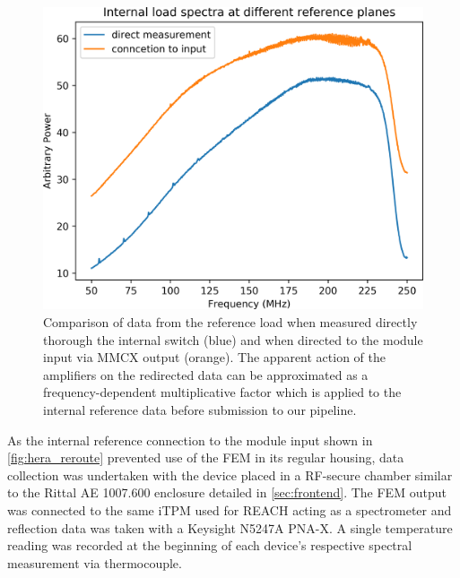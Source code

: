 \begin{figure}
    \centering
    \includegraphics[width=.6\textwidth]{mmcx_compare}
    \caption{Comparison of data from the reference load when measured directly thorough the internal switch (blue) and when directed to the module input via MMCX output (orange). The apparent action of the amplifiers on the redirected data can be approximated as a frequency-dependent multiplicative factor which is applied to the internal reference data before submission to our pipeline.}
    \label{fig:mmcx_compare}
\end{figure}

As the internal reference connection to the module input shown in \cref{fig:hera_reroute} prevented use of the FEM in its regular housing, data collection was undertaken with the device placed in a RF-secure chamber similar to the Rittal AE 1007.600 enclosure detailed in \cref{sec:frontend}. The FEM output was connected to the same iTPM used for REACH acting as a spectrometer and reflection data was taken with a Keysight N5247A PNA-X. A single temperature reading was recorded at the beginning of each device's respective spectral measurement via thermocouple.

